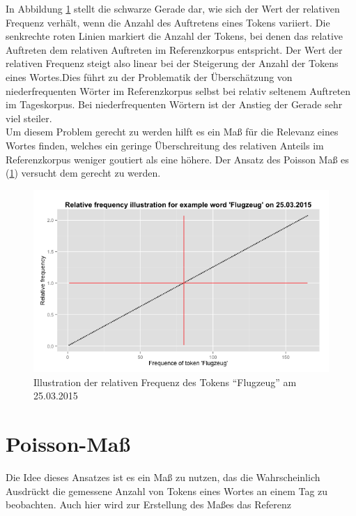 In Abbildung \ref{pic.rel_freq} stellt die schwarze Gerade dar, wie sich der Wert der relativen Frequenz verhält, wenn die Anzahl des Auftretens eines Tokens variiert. Die senkrechte roten Linien markiert die Anzahl der Tokens, bei denen das relative Auftreten dem relativen Auftreten im Referenzkorpus entspricht. Der Wert der relativen Frequenz steigt also linear bei der Steigerung der Anzahl der Tokens eines Wortes.Dies führt zu der Problematik der Überschätzung von niederfrequenten Wörter im Referenzkorpus selbst bei relativ seltenem Auftreten im Tageskorpus. Bei niederfrequenten Wörtern ist der Anstieg der Gerade sehr viel steiler.\\
Um diesem Problem gerecht zu werden hilft es ein Maß für die Relevanz eines Wortes finden, welches ein geringe Überschreitung des relativen Anteils im Referenzkorpus weniger goutiert als eine höhere. Der Ansatz des Poisson Maß es (\ref{subsec.poisson}) versucht dem gerecht zu werden.\\
\begin{figure}[h!]
    \centering
    \includegraphics[width=1\textwidth]{pictures/relfreqFlugzeug.png}
    \caption{Illustration der relativen Frequenz des Tokens \enquote{Flugzeug} am 25.03.2015}\label{pic.rel_freq}
\end{figure}



\section{Poisson-Maß}\label{subsec.poisson}
Die Idee dieses Ansatzes ist es ein Maß zu nutzen, das die Wahrscheinlich Ausdrückt die gemessene Anzahl von Tokens eines Wortes an einem Tag zu beobachten. Auch hier wird zur Erstellung des Maßes  das Referenz

